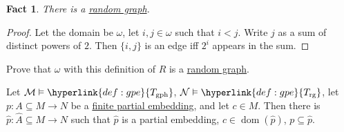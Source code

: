 \documentclass{article}
\let\models\vDash
\DeclareMathOperator{\dom}{dom}
\newtheorem{nfact}[nthm]{Fact}
\begin{document}
\begin{nfact}\label{fact:4.15}
  There is a \hyperlink{def:rgraph}{random graph}.
\end{nfact}
\begin{proof}
  Let the domain be $\omega$, let $i,j \in \omega$ such that $i < j$.
  Write $j$ as a sum of distinct powers of $2$.
  Then $\{i,j\}$ is an edge iff $2^i$ appears in the sum.
\end{proof}
\begin{exercise}
  Prove that $\omega$ with this definition of $R$ is a \hyperlink{def:rgraph}{random graph}.
\end{exercise}
\begin{nlemma}\label{lem:4.17}
  Let $\mathcal{M} \models \hyperlink{def:gpe}{T_{\text{gph}}}$, $\mathcal{N} \models \hyperlink{def:gpe}{T_{\text{rg}}}$, let $p: A \subseteq M \to N$ be a \hyperlink{def:gpe}{finite partial embedding}, and let $c \in M$.
  Then there is $\hat{p}: \hat{A} \subseteq M \to N$ such that $\hat{p}$ is a partial embedding, $c \in \dom(\hat{p})$, $p \subseteq \hat{p}$.
\end{nlemma}
\end{document}

